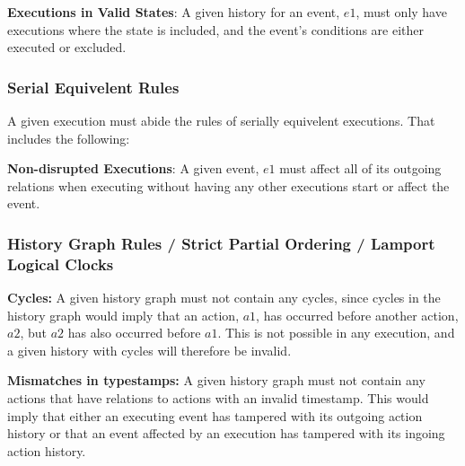 	\newpar \textbf{Executions in Valid States}: A given history for an event, $e1$, must only have executions where the state is included, and the event's conditions are either executed or excluded.
	
	\subsubsection{Serial Equivelent Rules}
	A given execution must abide the rules of serially equivelent executions. That includes the following:
	
	\newpar \textbf{Non-disrupted Executions}: A given event, $e1$ must affect all of its outgoing relations when executing without having any other executions start or affect the event.
	
	\subsubsection{History Graph Rules / Strict Partial Ordering / Lamport Logical Clocks}
	\textbf{Cycles:} A given history graph must not contain any cycles, since cycles in the history graph would imply that an action, $a1$, has occurred before another action, $a2$, but $a2$ has also occurred before $a1$. This is not possible in any execution, and a given history with cycles will therefore be invalid.
	
	\newpar \textbf{Mismatches in typestamps:} A given history graph must not contain any actions that have relations to actions with an invalid timestamp. This would imply that either an executing event has tampered with its outgoing action history or that an event affected by an execution has tampered with its ingoing action history. 
	
	
	

